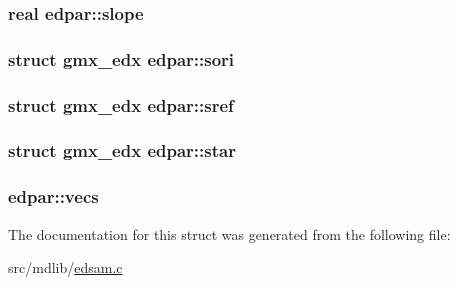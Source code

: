 \hypertarget{structedpar_ad43ae47e3428cee1eb8dad52d2459645}{
\subsubsection[{slope}]{\setlength{\rightskip}{0pt plus 5cm}real {\bf edpar\-::slope}}}\label{structedpar_ad43ae47e3428cee1eb8dad52d2459645}
\hypertarget{structedpar_ae46e44e563149785fc8b79dfe253574b}{
\subsubsection[{sori}]{\setlength{\rightskip}{0pt plus 5cm}struct {\bf gmx\-\_\-edx} {\bf edpar\-::sori}}}\label{structedpar_ae46e44e563149785fc8b79dfe253574b}
\hypertarget{structedpar_ad1dfcfadcc51c16ad5972735f90b78f9}{
\subsubsection[{sref}]{\setlength{\rightskip}{0pt plus 5cm}struct {\bf gmx\-\_\-edx} {\bf edpar\-::sref}}}\label{structedpar_ad1dfcfadcc51c16ad5972735f90b78f9}
\hypertarget{structedpar_a0c00587026e89bcae770953f1453f4c1}{
\subsubsection[{star}]{\setlength{\rightskip}{0pt plus 5cm}struct {\bf gmx\-\_\-edx} {\bf edpar\-::star}}}\label{structedpar_a0c00587026e89bcae770953f1453f4c1}
\hypertarget{structedpar_a5d91b78081aa45028af7624d609c5980}{
\subsubsection[{vecs}]{ {\bf edpar\-::vecs}}}\label{structedpar_a5d91b78081aa45028af7624d609c5980}


\-The documentation for this struct was generated from the following file\-:\begin{DoxyCompactItemize}
\item 
src/mdlib/\hyperlink{edsam_8c}{edsam.\-c}\end{DoxyCompactItemize}
